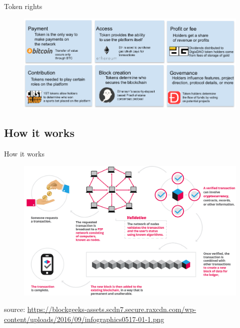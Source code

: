 \documentclass[9pt]{beamer}
\begin{document}

\begin{frame}{Token rights}
	\begin{figure}[]
		\centering
		\includegraphics  [scale=0.35]{Images/token-rights}
	\end{figure}
\end{frame}


\subsection{How it works}


\begin{frame}{How it works}
	\begin{figure}[]
		\centering
		\includegraphics  [scale=0.25]{Images/infographic}
	\end{figure}
	\begin{scriptsize}
		source: \href{https://blockgeeks.com/guides/what-is-blockchain-technology/}{https://blockgeeks-assets.scdn7.secure.raxcdn.com/wp-content/uploads/2016/09/infographics0517-01-1.png}
	\end{scriptsize}
\end{frame}
\end{document}
